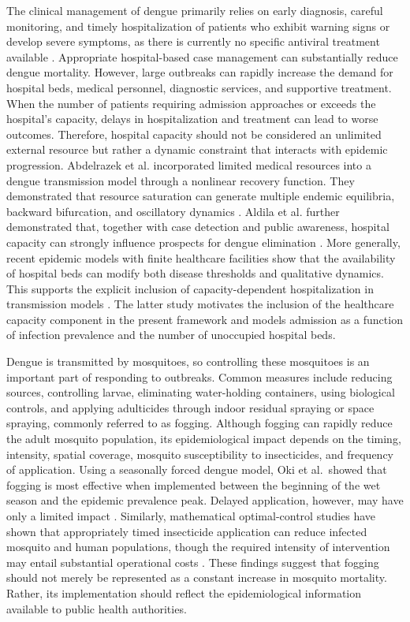 \documentclass[preprint]{elsarticle}
\begin{document}
{The clinical management of dengue primarily relies on early diagnosis, careful monitoring, and timely hospitalization of patients who exhibit warning signs or develop severe symptoms, as there is currently no specific antiviral treatment available \cite{wilder2019dengue,PazBailey2024Dengue}. Appropriate hospital-based case management can substantially reduce dengue mortality. However, large outbreaks can rapidly increase the demand for hospital beds, medical personnel, diagnostic services, and supportive treatment. When the number of patients requiring admission approaches or exceeds the hospital's capacity, delays in hospitalization and treatment can lead to worse outcomes. Therefore, hospital capacity should not be considered an unlimited external resource but rather a dynamic constraint that interacts with epidemic progression. Abdelrazek et al. incorporated limited medical resources into a dengue transmission model through a nonlinear recovery function. They demonstrated that resource saturation can generate multiple endemic equilibria, backward bifurcation, and oscillatory dynamics \cite{abdelrazec2016modeling}. Aldila et al. further demonstrated that, together with case detection and public awareness, hospital capacity can strongly influence prospects for dengue elimination \cite{aldila2023impact}. More generally, recent epidemic models with finite healthcare facilities show that the availability of hospital beds can modify both disease thresholds and qualitative dynamics. This supports the explicit inclusion of capacity-dependent hospitalization in transmission models \cite{misra2026multiobjective}. The latter study motivates the inclusion of the healthcare capacity component in the present framework and models admission as a function of infection prevalence and the number of unoccupied hospital beds.}

{Dengue is transmitted by mosquitoes, so controlling these mosquitoes is an important part of responding to outbreaks. Common measures include reducing sources, controlling larvae, eliminating water-holding containers, using biological controls, and applying adulticides through indoor residual spraying or space spraying, commonly referred to as fogging. Although fogging can rapidly reduce the adult mosquito population, its epidemiological impact depends on the timing, intensity, spatial coverage, mosquito susceptibility to insecticides, and frequency of application. Using a seasonally forced dengue model, Oki et al.\ showed that fogging is most effective when implemented between the beginning of the wet season and the epidemic prevalence peak. Delayed application, however, may have only a limited impact \cite{oki2011optimal}. Similarly, mathematical optimal-control studies have shown that appropriately timed insecticide application can reduce infected mosquito and human populations, though the required intensity of intervention may entail substantial operational costs \cite{rodrigues2010insecticide,rodrigues2013bioeconomic,fitria2017optimal}. These findings suggest that fogging should not merely be represented as a constant increase in mosquito mortality. Rather, its implementation should reflect the epidemiological information available to public health authorities.}
\end{document}
